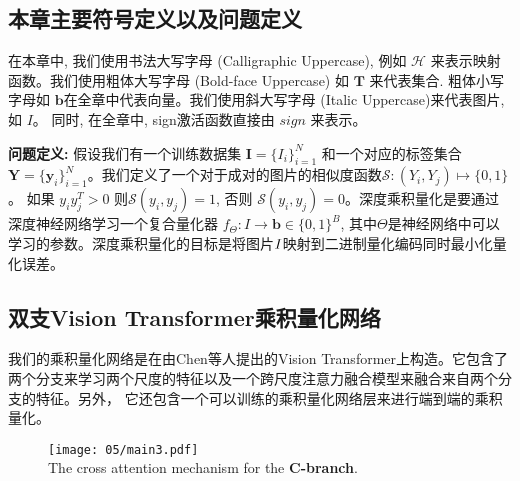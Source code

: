 \subsection{本章主要符号定义以及问题定义}
在本章中, 我们使用书法大写字母 (Calligraphic Uppercase), 例如 $\mathcal{H}$ 来表示映射函数。我们使用粗体大写字母 (Bold-face Uppercase) 如 $\mathbf{T}$ 来代表集合. 粗体小写字母如 $\mathbf{b}$在全章中代表向量。我们使用斜大写字母 (Italic Uppercase)来代表图片, 如 $\textit{I}$。 同时, 在全章中, sign激活函数直接由 $\textit{sign}$ 来表示。\par
\textbf{问题定义:} 假设我们有一个训练数据集 $\mathbf{I} = \{ I_i\}_{i = 1}^N$ 和一个对应的标签集合$\mathbf{Y} = \{\mathbf{y}_i\}_{i=1}^N$。我们定义了一个对于成对的图片的相似度函数$\mathcal{S}: (Y_i,Y_j) \mapsto \{0,1\}$。 如果 $y_i y_j^T > 0$ 则$\mathcal{S}(y_i,y_j) = 1$, 否则 $\mathcal{S}(y_i,y_j) = 0$。深度乘积量化是要通过深度神经网络学习一个复合量化器
$f_{\Theta}: I \rightarrow \mathbf{b} \in \{ 0,1 \}^B$, 其中$\Theta$是神经网络中可以学习的参数。深度乘积量化的目标是将图片$\it{I}$映射到二进制量化编码同时最小化量化误差。
\subsection{双支Vision Transformer乘积量化网络}
我们的乘积量化网络是在由Chen等人提出\cite{chen2021crossvit}的Vision Transformer上构造。它包含了两个分支来学习两个尺度的特征以及一个跨尺度注意力融合模型来融合来自两个分支的特征。另外， 它还包含一个可以训练的乘积量化网络层来进行端到端的乘积量化。 \par
\begin{figure}[!htp]
  \centering
  \texttt{[image: 05/main3.pdf]} \\
    { The cross attention mechanism for the \textbf{C-branch}.}
 \label{fig:mainapq3}
\end{figure} 



